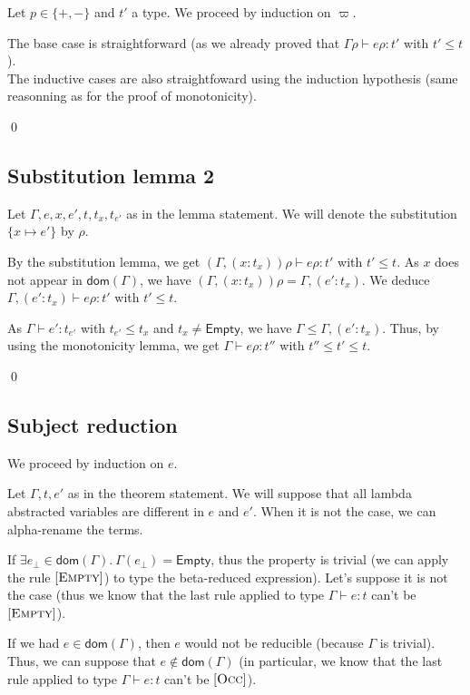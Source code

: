 \documentclass[a4paper]{article}%
\newcommand{\dom}[1]{\textsf{dom}(#1)}
\newcommand{\Empty} {\textsf{Empty}}%
\newcommand{\subst}[2]{\{#1 \mapsto #2\}}
\theoremstyle{definition}
\newcommand {\Rule}[1] {[\textsc{#1}]}
\begin{document}
    Let $p\in \{+,-\}$ and $t'$ a type.
    We proceed by induction on $\varpi$.

    The base case is straightforward (as we already proved that $\Gamma \rho \vdash e \rho:t'$ with $t'\leq t$).\\
    The inductive cases are also straightfoward using the induction hypothesis (same reasonning as for the proof of monotonicity).

    \qed

    \subsection{Substitution lemma 2}

    Let $\Gamma,e,x,e',t,t_x,t_{e'}$ as in the lemma statement.
    We will denote the substitution $\subst x {e'}$ by $\rho$.

    By the substitution lemma, we get $(\Gamma, (x:t_x))\rho \vdash e\rho:t'$ with $t' \leq t$.
    As $x$ does not appear in $\dom \Gamma$, we have $(\Gamma, (x:t_x))\rho = \Gamma, (e':t_x)$.
    We deduce $\Gamma, (e':t_x) \vdash e\rho:t'$ with $t' \leq t$.

    As $\Gamma \vdash e':t_{e'}$ with $t_{e'} \leq t_x$ and $t_x \neq \Empty$, we have $\Gamma \leq \Gamma, (e':t_x)$.
    Thus, by using the monotonicity lemma, we get $\Gamma\vdash e\rho:t''$ with $t'' \leq t' \leq t$.

    \qed

    \subsection{Subject reduction}

    We proceed by induction on $e$.

    Let $\Gamma,t,e'$ as in the theorem statement.
    We will suppose that all lambda abstracted variables are different in $e$ and $e'$. When it is not the case, we can alpha-rename the terms.

    If $\exists e_{\bot} \in \dom\Gamma.\ \Gamma(e_{\bot}) = \Empty$, thus the property is trivial
    (we can apply the rule $\Rule {Empty}$) to type the beta-reduced expression).
    Let's suppose it is not the case (thus we know that the last rule applied to type $\Gamma \vdash e:t$ can't be $\Rule{Empty}$).

    If we had $e\in\dom\Gamma$, then $e$ would not be reducible (because $\Gamma$ is trivial).
    Thus, we can suppose that $e\not\in\dom\Gamma$ (in particular, we know that the last rule applied to type $\Gamma \vdash e:t$ can't be $\Rule{Occ}$).
\end{document}
